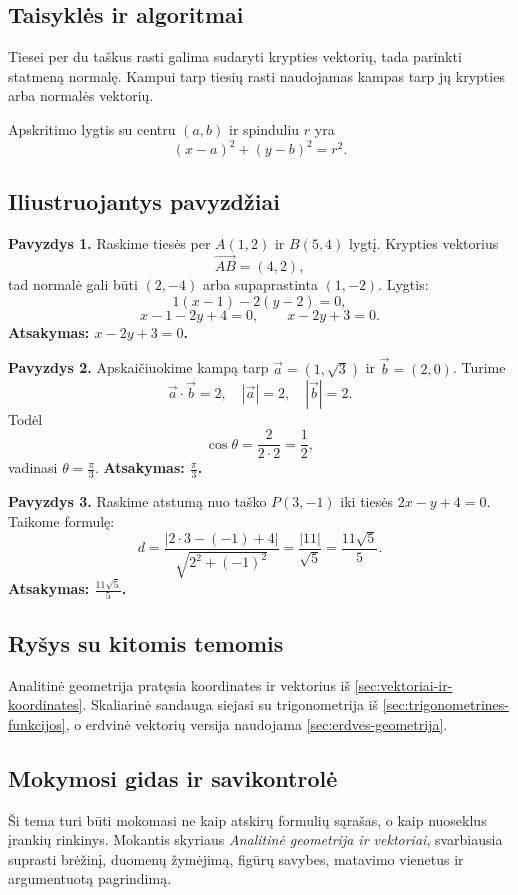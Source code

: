 \subsection{Taisyklės ir algoritmai}

Tiesei per du taškus rasti galima sudaryti krypties vektorių, tada parinkti statmeną normalę. Kampui tarp tiesių rasti naudojamas kampas tarp jų krypties arba normalės vektorių.

Apskritimo lygtis su centru $(a,b)$ ir spinduliu $r$ yra
\[
(x-a)^2+(y-b)^2=r^2.
\]

\subsection{Iliustruojantys pavyzdžiai}

\textbf{Pavyzdys 1.} Raskime tiesės per $A(1,2)$ ir $B(5,4)$ lygtį. Krypties vektorius
\[
\overrightarrow{AB}=(4,2),
\]
tad normalė gali būti $(2,-4)$ arba supaprastinta $(1,-2)$. Lygtis:
\[
1(x-1)-2(y-2)=0,
\]
\[
x-1-2y+4=0,\qquad x-2y+3=0.
\]
\textbf{Atsakymas: $x-2y+3=0$.}

\textbf{Pavyzdys 2.} Apskaičiuokime kampą tarp $\vec a=(1,\sqrt3)$ ir $\vec b=(2,0)$. Turime
\[
\vec a\cdot\vec b=2,\quad |\vec a|=2,\quad |\vec b|=2.
\]
Todėl
\[
\cos\theta=\frac{2}{2\cdot2}=\frac12,
\]
vadinasi $\theta=\frac{\pi}{3}$. \textbf{Atsakymas: $\frac{\pi}{3}$.}

\textbf{Pavyzdys 3.} Raskime atstumą nuo taško $P(3,-1)$ iki tiesės $2x-y+4=0$. Taikome formulę:
\[
d=\frac{|2\cdot3-(-1)+4|}{\sqrt{2^2+(-1)^2}}
=\frac{|11|}{\sqrt5}=\frac{11\sqrt5}{5}.
\]
\textbf{Atsakymas: $\frac{11\sqrt5}{5}$.}

\subsection{Ryšys su kitomis temomis}

Analitinė geometrija pratęsia koordinates ir vektorius iš \ref{sec:vektoriai-ir-koordinates}. Skaliarinė sandauga siejasi su trigonometrija iš \ref{sec:trigonometrines-funkcijos}, o erdvinė vektorių versija naudojama \ref{sec:erdves-geometrija}.

\subsection{Mokymosi gidas ir savikontrolė}

Ši tema turi būti mokomasi ne kaip atskirų formulių sąrašas, o kaip nuoseklus įrankių rinkinys. Mokantis skyriaus \textit{Analitinė geometrija ir vektoriai}, svarbiausia suprasti brėžinį, duomenų žymėjimą, figūrų savybes, matavimo vienetus ir argumentuotą pagrindimą.

